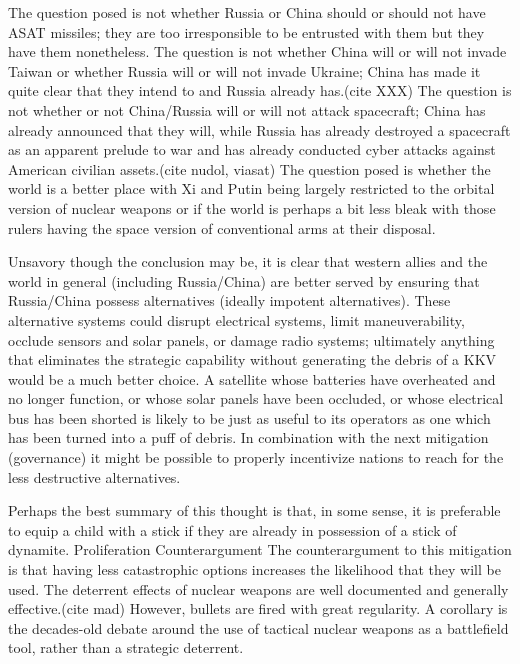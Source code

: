 The question posed is not whether Russia or China should or should not have ASAT missiles; they are too irresponsible to be entrusted with them but they have them nonetheless.  The question is not whether China will or will not invade Taiwan or whether Russia will or will not invade Ukraine; China has made it quite clear that they intend to and Russia already has.(cite XXX)  The question is not whether or not China/Russia will or will not attack spacecraft; China has already announced that they will, while Russia has already destroyed a spacecraft as an apparent prelude to war and has already conducted cyber attacks against American civilian assets.(cite nudol, viasat)  The question posed is whether the world is a better place with Xi and Putin being largely restricted to the orbital version of nuclear weapons or if the world is perhaps a bit less bleak with those rulers having the space version of conventional arms at their disposal.

Unsavory though the conclusion may be, it is clear that western allies and the world in general (including Russia/China) are better served by ensuring that Russia/China possess alternatives (ideally impotent alternatives).  These alternative systems could disrupt electrical systems, limit maneuverability, occlude sensors and solar panels, or damage radio systems; ultimately anything that eliminates the strategic capability without generating the debris of a KKV would be a much better choice.  A satellite whose batteries have overheated and no longer function, or whose solar panels have been occluded, or whose electrical bus has been shorted is likely to be just as useful to its operators as one which has been turned into a puff of debris.  In combination with the next mitigation (governance) it might be possible to properly incentivize nations to reach for the less destructive alternatives.

Perhaps the best summary of this thought is that, in some sense, it is preferable to equip a child with a stick if they are already in possession of a stick of dynamite.
Proliferation Counterargument
The counterargument to this mitigation is that having less catastrophic options increases the likelihood that they will be used.  The deterrent effects of nuclear weapons are well documented and generally effective.(cite mad)  However, bullets are fired with great regularity.  A corollary is the decades-old debate around the use of tactical nuclear weapons as a battlefield tool, rather than a strategic deterrent.

